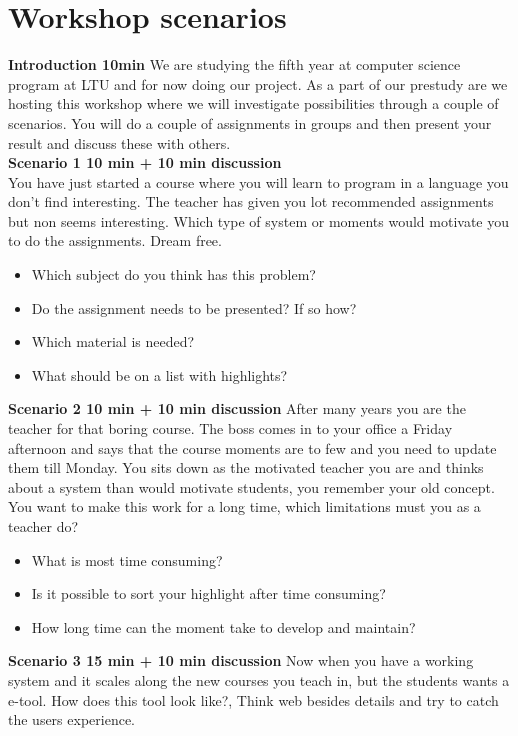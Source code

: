 \chapter{Workshop scenarios}\label{Worskshop:senarios}
\textbf{Introduction 10min}
We are studying the fifth year at computer science program at LTU and for now doing our project. As a part of our prestudy are we hosting this workshop where we will investigate possibilities through a couple of scenarios. You will do a couple of assignments in groups and then present your result and discuss these with others.\\

\textbf{Scenario 1 10 min + 10 min discussion}\\
You have just started a course where you will learn to program in a language you don't find interesting. The teacher has given you lot recommended assignments but non seems interesting. Which type of system or moments would motivate you to do the assignments. Dream free.
\begin{itemize}
\item Which subject do you think has this problem?
\item Do the assignment needs to be presented? If so how?
\item Which material is needed?
\item What should be on a list with highlights?
\end{itemize} 

\textbf{Scenario 2 10 min + 10 min discussion}
After many years you are the teacher for that boring course. The boss comes in to your office a Friday afternoon and says that the course moments are to few and you need to update them till Monday. You sits down as the motivated teacher you are and thinks about a system than would motivate students, you remember your old concept. \\
You want to make this work for a long time, which limitations must you as a teacher do?\\
\begin{itemize}
\item What is most time consuming?
\item Is it possible to sort your highlight after time consuming?
\item How long time can the moment take to develop and maintain?
\end{itemize} 

\textbf{Scenario 3 15 min + 10 min discussion}
Now when you have a working system and it scales along the new courses you teach in, but the students wants a e-tool. How does this tool look like?, Think web besides details and try to catch the users experience.

